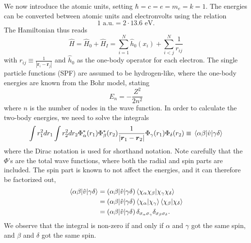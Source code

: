 We now introduce the atomic units, setting $\hbar=c=e=m_e=k=1$. 
The energies can be converted between atomic units and electronvolts using the relation
\begin{equation}
1 \text{ a.u.} = 2\cdot13.6 \text{ eV}.
\end{equation}
The Hamiltonian thus reads
\begin{equation}
\hat{H}=\hat{H}_0 + \hat{H}_I=\sum_{i=1}^N\hat{h}_0(x_i)+\sum_{i<j}^N\frac{1}{r_{ij}}
\end{equation}
with $r_{ij}\equiv\frac{1}{|\boldsymbol{r}_i-\boldsymbol{r}_j|}$ and $\hat{h}_0$ as the one-body operator for each electron. The single particle functions (SPF) are assumed to be hydrogen-like, where the one-body energies are known from the Bohr model, stating
\begin{equation}
E_n=-\frac{Z^2}{2n^2}
\end{equation}
where $n$ is the number of nodes in the wave function. In order to calculate the two-body energies, we need to solve the integrals 
\begin{equation}
\int r_1^2dr_1\int r_2^2dr_2 \Phi_{\alpha}^*(r_1)\Phi_{\beta}^*(r_2)\frac{1}{|\boldsymbol{r}_1-\boldsymbol{r}_2|}\Phi_{\gamma}(r_1)\Phi_{\delta}(r_2)\equiv\mel{\alpha\beta}{\hat{v}}{\gamma\delta}
\end{equation}
where the Dirac notation is used for shorthand notation. Note carefully that the $\Phi$'s are the total wave functions, where both the radial and spin parts are included. The spin part is known to not affect the energies, and it can therefore be factorized out,
\begin{align}
\mel{\alpha\beta}{\hat{v}}{\gamma\delta}&=(\alpha\beta|\hat{v}|\gamma\delta)\braket{\chi_{\alpha}\chi_{\beta}}{\chi_{\gamma}\chi_{\delta}}\notag\\
&=(\alpha\beta|\hat{v}|\gamma\delta)\braket{\chi_{\alpha}}{\chi_{\gamma}}\braket{\chi_{\beta}}{\chi_{\delta}}\\
&=(\alpha\beta|\hat{v}|\gamma\delta)\,\delta_{\sigma_{\alpha}\sigma_{\gamma}}\delta_{\sigma_{\beta}\sigma_{\delta}}.\notag
\end{align}
We observe that the integral is non-zero if and only if $\alpha$ and $\gamma$ got the same spin, and $\beta$ and $\delta$ got the same spin.

